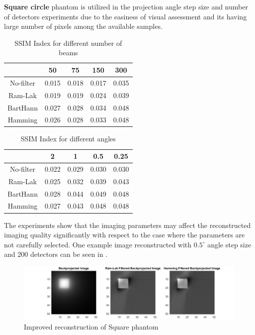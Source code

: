 \documentclass[journal]{IEEEtran}
\begin{document}
\newpage
\textbf{Square circle} phantom is utilized in the projection angle step size and number of detectors experiments due to the easiness of visual assessment and its having large number of pixels among the available samples. 
\begin{table}[h]
	\centering
	\begin{tabular}{|c|c|c|c|c|}
		\hline 
		\diagbox{Filters}{Beams} & 50 & 75 & 150 & 300 \\ 
		\hline 
		No-filter & 0.015 & 0.018 & 0.017 & 0.035 \\ 
		Ram-Lak & 0.019 & 0.019 & 0.024 & 0.039 \\ 
		BartHann & 0.027 & 0.028 & 0.034 & 0.048 \\ 
		Hamming & 0.026 & 0.028 & 0.033 & 0.048 \\ 
		\hline 
		\end{tabular}
	\caption{\label{tab:beams}SSIM Index for different number of beams}
\end{table}
\begin{table}[h]
	\centering
	\begin{tabular}{|c|c|c|c|c|}
		\hline 
		\diagbox{Filters}{Angles} & 2 & 1 & 0.5 & 0.25 \\ 
		\hline 
		No-filter & 0.022 & 0.029 & 0.030 & 0.030 \\ 
		Ram-Lak & 0.025 & 0.032 & 0.039 & 0.043 \\ 
		BartHann & 0.028 & 0.044 & 0.049 & 0.048 \\ 
		Hamming & 0.027 & 0.043 & 0.048 & 0.048 \\ 
		\hline 
		\end{tabular}
	\caption{\label{tab:angle}SSIM Index for different angles}
\end{table}
The experiments show that the imaging parameters may affect the reconstructed imaging quality significantly with respect to the case where the parameters are not carefully selected. One example image reconstructed with $0.5^\circ$ angle step size and 200 detectors can be seen in .
\begin{figure}[h]
	\centering
	\includegraphics[width=\columnwidth,height=.12\textheight]{images/sq_improved.png}
	\caption{Improved reconstruction of Square phantom}\label{fig:sqimproved}
\end{figure}
\end{document}
